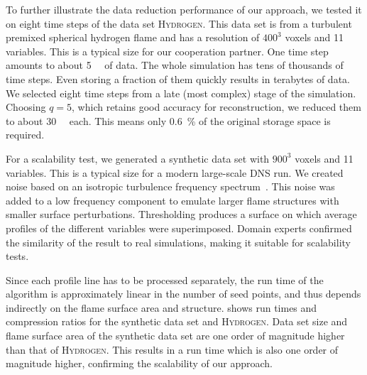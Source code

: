 %
To further illustrate the data reduction performance of our approach, we tested
it on eight time steps of the data set \textsc{Hydrogen}.
%
This data set is from a turbulent premixed spherical hydrogen flame and has a
resolution of $\num{400}^3$ voxels and \num{11} variables.
%
This is a typical size for our cooperation partner.
%
One time step amounts to about \SI{5}{\giga\byte} of data.
%
The whole simulation has tens of thousands of time steps.
%
Even storing a fraction of them quickly results in terabytes of data.
%
We selected eight time steps from a late (most complex) stage of the simulation.
%
Choosing $q=5$, which retains good accuracy for reconstruction, we reduced them
to about \SI{30}{\mega\byte} each.
%
This means only \SI{0.6}{\percent} of the original storage space is required.
%

%
For a scalability test, we generated a synthetic data set with $\num{900}^3$
voxels and \num{11} variables.
%
This is a typical size for a modern large-scale \ac{DNS} run.
%
We created noise based on an isotropic turbulence frequency
spectrum~\cite{Ferrante2003}.
%
This noise was added to a low frequency component to emulate larger flame
structures with smaller surface perturbations.
%
Thresholding produces a surface on which average profiles of the different
variables were superimposed.
%
Domain experts confirmed the similarity of the result to real simulations,
making it suitable for scalability tests.
%

%
Since each profile line has to be processed separately, the run time of the
algorithm is approximately linear in the number of seed points, and thus depends
indirectly on the flame surface area and structure.
%
 shows run times and compression ratios for
the synthetic data set and \textsc{Hydrogen}.
%
Data set size and flame surface area of the synthetic data set are one order
of magnitude higher than that of \textsc{Hydrogen}.
%
This results in a run time which is also one order of magnitude higher,
confirming the scalability of our approach.
%

%
%
%
